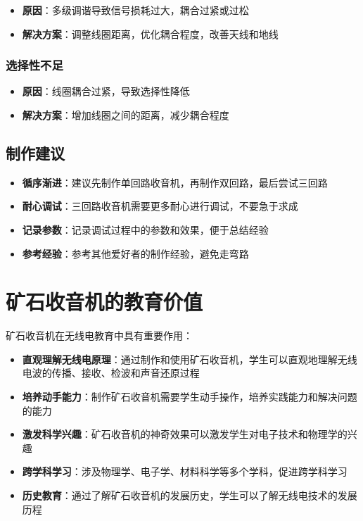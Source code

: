 \documentclass[12pt,UTF8]{ctexbook}
\begin{document}
\begin{itemize}[leftmargin=3.5em]
    \item \textbf{原因}：多级调谐导致信号损耗过大，耦合过紧或过松
    \item \textbf{解决方案}：调整线圈距离，优化耦合程度，改善天线和地线
\end{itemize}

\subsection{选择性不足}

\begin{itemize}[leftmargin=3.5em]
    \item \textbf{原因}：线圈耦合过紧，导致选择性降低
    \item \textbf{解决方案}：增加线圈之间的距离，减少耦合程度
\end{itemize}

\section{制作建议}

\begin{itemize}[leftmargin=3.5em]
    \item \textbf{循序渐进}：建议先制作单回路收音机，再制作双回路，最后尝试三回路
    \item \textbf{耐心调试}：三回路收音机需要更多耐心进行调试，不要急于求成
    \item \textbf{记录参数}：记录调试过程中的参数和效果，便于总结经验
    \item \textbf{参考经验}：参考其他爱好者的制作经验，避免走弯路
\end{itemize}

\chapter{矿石收音机的教育价值}

矿石收音机在无线电教育中具有重要作用：
\begin{itemize}[leftmargin=3.5em]
    \item \textbf{直观理解无线电原理}：通过制作和使用矿石收音机，学生可以直观地理解无线电波的传播、接收、检波和声音还原过程
    \item \textbf{培养动手能力}：制作矿石收音机需要学生动手操作，培养实践能力和解决问题的能力
    \item \textbf{激发科学兴趣}：矿石收音机的神奇效果可以激发学生对电子技术和物理学的兴趣
    \item \textbf{跨学科学习}：涉及物理学、电子学、材料科学等多个学科，促进跨学科学习
    \item \textbf{历史教育}：通过了解矿石收音机的发展历史，学生可以了解无线电技术的发展历程
\end{itemize}
\end{document}
